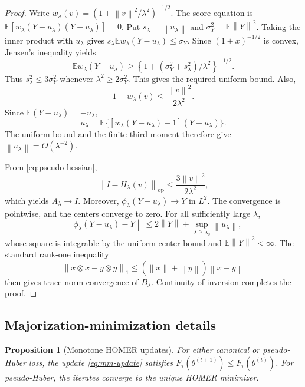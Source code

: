 \documentclass[twoside]{article}
\newtheorem{proposition}[theorem]{Proposition}
\theoremstyle{definition}
\newcommand{\E}{\mathbb E}
\newcommand{\norm}[1]{\left\lVert #1\right\rVert}
\newcommand{\op}{\mathrm{op}}
\begin{document}
\begin{proof}
Write $w_\lambda(v)=(1+\norm v^2/\lambda^2)^{-1/2}$. The score equation is $\E[w_\lambda(Y-u_\lambda)(Y-u_\lambda)]=0$. Put $s_\lambda=\norm{u_\lambda}$ and $\sigma_Y^2=\E\norm Y^2$. Taking the inner product with $u_\lambda$ gives $s_\lambda\E w_\lambda(Y-u_\lambda)\le\sigma_Y$. Since $(1+x)^{-1/2}$ is convex, Jensen's inequality yields
\[
    \E w_\lambda(Y-u_\lambda)
    \ge\left\{1+(\sigma_Y^2+s_\lambda^2)/\lambda^2\right\}^{-1/2}.
\]
Thus $s_\lambda^2\le3\sigma_Y^2$ whenever $\lambda^2\ge2\sigma_Y^2$. This gives the required uniform bound. Also,
\[
    1-w_\lambda(v)\le\frac{\norm v^2}{2\lambda^2}.
\]
Since $\E(Y-u_\lambda)=-u_\lambda$,
\[
    u_\lambda
    =\E\{[w_\lambda(Y-u_\lambda)-1](Y-u_\lambda)\}.
\]
The uniform bound and the finite third moment therefore give $\norm{u_\lambda}=O(\lambda^{-2})$.

From \eqref{eq:pseudo-hessian},
\[
    \norm{I-H_\lambda(v)}_{\op}
    \le \frac{3\norm v^2}{2\lambda^2},
\]
which yields $A_\lambda\to I$. Moreover, $\phi_\lambda(Y-u_\lambda)\to Y$ in $L^2$. The convergence is pointwise, and the centers converge to zero. For all sufficiently large $\lambda$,
\[
    \norm{\phi_\lambda(Y-u_\lambda)-Y}
    \le 2\norm Y+\sup_{\lambda\ge\lambda_0}\norm{u_\lambda},
\]
whose square is integrable by the uniform center bound and $\E\norm Y^2<\infty$. The standard rank-one inequality
\[
    \norm{x\otimes x-y\otimes y}_1
    \le(\norm x+\norm y)\norm{x-y}
\]
then gives trace-norm convergence of $B_\lambda$. Continuity of inversion completes the proof.
\end{proof}

\subsection{Majorization-minimization details}\label{app:algorithm}

\begin{proposition}[Monotone HOMER updates]\label{prop:mm}
For either canonical or pseudo-Huber loss, the update \eqref{eq:mm-update} satisfies
$F_\tau(\theta^{(t+1)})\le F_\tau(\theta^{(t)})$. For pseudo-Huber, the iterates converge to the unique HOMER minimizer.
\end{proposition}
\end{document}
